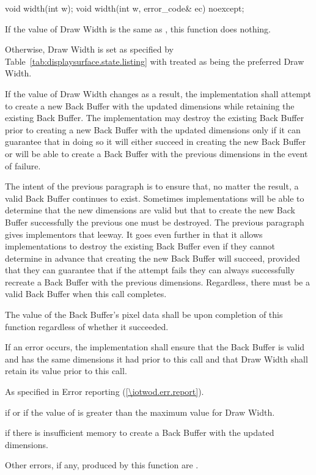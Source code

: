 \begin{itemdecl}
void width(int w);
void width(int w, error_code& ec) noexcept;
\end{itemdecl}
\begin{itemdescr}
\pnum
\effects
If the value of Draw Width is the same as , this function does nothing.

\pnum
Otherwise, Draw Width is set as specified by Table~\ref{tab:displaysurface.state.listing} with  treated as being the preferred Draw Width.

\pnum
If the value of Draw Width changes as a result, the implementation shall attempt to create a new Back Buffer with the updated dimensions while retaining the existing Back Buffer. The implementation may destroy the existing Back Buffer prior to creating a new Back Buffer with the updated dimensions only if it can guarantee that in doing so it will either succeed in creating the new Back Buffer or will be able to create a Back Buffer with the previous dimensions in the event of failure.

\pnum
\enternote
The intent of the previous paragraph is to ensure that, no matter the result, a valid Back Buffer continues to exist. Sometimes implementations will be able to determine that the new dimensions are valid but that to create the new Back Buffer successfully the previous one must be destroyed. The previous paragraph gives implementors that leeway. It goes even further in that it allows implementations to destroy the existing Back Buffer even if they cannot determine in advance that creating the new Back Buffer will succeed, provided that they can guarantee that if the attempt fails they can always successfully recreate a Back Buffer with the previous dimensions. Regardless, there must be a valid Back Buffer when this call completes.
\exitnote

\pnum
The value of the Back Buffer's pixel data shall be \unspecnorm upon completion of this function regardless of whether it succeeded.

\pnum
If an error occurs, the implementation shall ensure that the Back Buffer is valid and has the same dimensions it had prior to this call and that Draw Width shall retain its value prior to this call.

\pnum
\throws
As specified in Error reporting (\ref{\iotwod.err.report}).

\pnum
\errors
{} if  or if the value of  is greater than the maximum value for Draw Width.

 if there is insufficient memory to create a Back Buffer with the updated dimensions.

Other errors, if any, produced by this function are .
\end{itemdescr}

